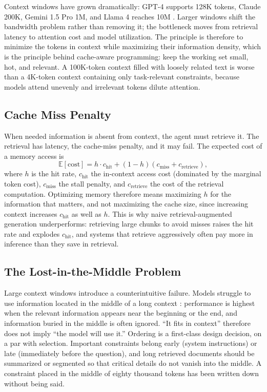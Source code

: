 \documentclass[11pt]{book}
\begin{document}
Context windows have grown dramatically: GPT-4 supports 128K tokens, Claude 200K, Gemini 1.5 Pro 1M, and Llama 4 reaches 10M \cite{anthropic2025claude}. Larger windows shift the bandwidth problem rather than removing it; the bottleneck moves from retrieval latency to attention cost and model utilization. The principle is therefore to minimize the tokens in context while maximizing their information density, which is the principle behind cache-aware programming: keep the working set small, hot, and relevant. A 100K-token context filled with loosely related text is worse than a 4K-token context containing only task-relevant constraints, because models attend unevenly and irrelevant tokens dilute attention.

\subsection{Cache Miss Penalty}

When needed information is absent from context, the agent must retrieve it. The retrieval has latency, the cache-miss penalty, and it may fail. The expected cost of a memory access is
\[
\mathbb{E}[\text{cost}] = h \cdot c_{\text{hit}} + (1-h)(c_{\text{miss}} + c_{\text{retrieve}}),
\]
where $h$ is the hit rate, $c_{\text{hit}}$ the in-context access cost (dominated by the marginal token cost), $c_{\text{miss}}$ the stall penalty, and $c_{\text{retrieve}}$ the cost of the retrieval computation. Optimizing memory therefore means maximizing $h$ for the information that matters, and not maximizing the cache size, since increasing context increases $c_{\text{hit}}$ as well as $h$. This is why naive retrieval-augmented generation underperforms: retrieving large chunks to avoid misses raises the hit rate and explodes $c_{\text{hit}}$, and systems that retrieve aggressively often pay more in inference than they save in retrieval.

\subsection{The Lost-in-the-Middle Problem}

Large context windows introduce a counterintuitive failure. Models struggle to use information located in the middle of a long context \cite{liu2024lost}: performance is highest when the relevant information appears near the beginning or the end, and information buried in the middle is often ignored. ``It fits in context'' therefore does not imply ``the model will use it.'' Ordering is a first-class design decision, on a par with selection. Important constraints belong early (system instructions) or late (immediately before the question), and long retrieved documents should be summarized or segmented so that critical details do not vanish into the middle. A constraint placed in the middle of eighty thousand tokens has been written down without being said.
\end{document}
